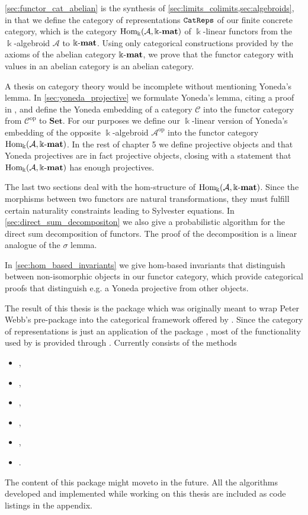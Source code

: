 \cref{sec:functor_cat_abelian} is the synthesis of \cref{sec:limits_colimits,sec:algebroids}, in that we define the category of representations $\texttt{CatReps}$
of our finite concrete category, which is the category $\mathrm{Hom_{\Bbbk}}(\mathcal{A},\Bbbk\textnormal{-}\mathbf{mat})$ of $\Bbbk$-linear functors from the $\Bbbk$-algebroid
$\mathcal{A}$ to $\Bbbk\textnormal{-}\mathbf{mat}$. Using only categorical constructions provided by the axioms of the abelian category $\Bbbk\textnormal{-}\mathbf{mat}$, we prove that
the functor category with values in an abelian category is an abelian category.

A thesis on category theory would be incomplete without mentioning Yoneda's lemma. In \cref{sec:yoneda_projective} we
formulate Yoneda's lemma, citing a proof in \cite[2.2]{[context]}, and define the Yoneda embedding of a category $\mathcal{C}$ into the
functor category from $\mathcal{C}^{\text{op}}$ to $\mathbf{Set}$. For our purposes we
define our $\Bbbk$-linear version of Yoneda's embedding of the opposite $\Bbbk$-algebroid $\mathcal{A}^{\text{op}}$
into the functor category $\mathrm{Hom_{\Bbbk}}(\mathcal{A},\Bbbk\textnormal{-}\mathbf{mat})$. In the rest of chapter 5 we define projective objects and that
Yoneda projectives are in fact projective objects, closing with a statement that $\mathrm{Hom_{\Bbbk}}(\mathcal{A},\Bbbk\textnormal{-}\mathbf{mat})$ has enough projectives.

The last two sections deal with the hom-structure of $\mathrm{Hom_{\Bbbk}}(\mathcal{A},\Bbbk\textnormal{-}\mathbf{mat})$. Since the morphisms between two
functors are natural transformations, they must fulfill certain naturality constraints leading to Sylvester equations. 
In \cref{sec:direct_sum_decompositon} we also give a probabilistic algorithm for the direct sum decomposition of functors. The proof of the decomposition is a linear
analogue of the $\sigma$ lemma.

In \cref{sec:hom_based_invariants} we give hom-based invariants that distinguish between non-isomorphic objects in our functor category, which provide 
categorical proofs that distinguish e.g. a Yoneda projective from other objects.

The result of this thesis is the \Gap package \CatReps which was originally meant to wrap Peter Webb's
pre-package \catreps into the categorical framework offered by \CAP. Since the category of representations is just an application of the package
\FunctorCategories, most of the functionality used by \CatReps is provided through \FunctorCategories.
Currently \CatReps consists of the methods
\begin{itemize}
\item {},
\item {},
\item {},
\item {},
\item {},
\item {}.
\end{itemize}
The content of this package might moveto \FunctorCategories in the future. All the algorithms developed and implemented while working on this
thesis are included as code listings in the appendix.
